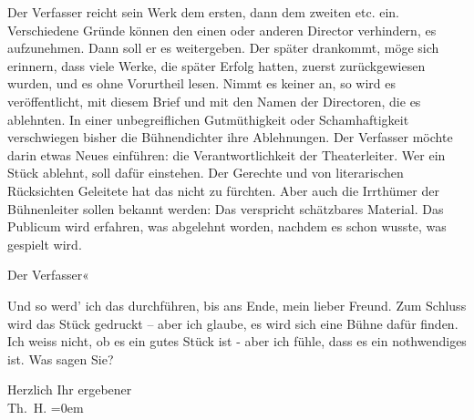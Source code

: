                Der Verfasser reicht sein Werk
               dem ersten, dann dem zweiten etc. ein. Verschiedene Gründe können den einen oder
               anderen Director verhindern, es aufzunehmen. Dann soll er es weitergeben. Der später
               drankommt, möge sich erinnern, dass viele Werke, die später Erfolg hatten, zuerst
               zurückgewiesen wurden, und es ohne Vorurtheil lesen. Nimmt es keiner an, so wird es
               veröffentlicht, mit diesem Brief {\pb}und mit
               den Namen der Directoren, die es ablehnten. In einer unbegreiflichen Gutmüthigkeit
               oder Schamhaftigkeit verschwiegen bisher die Bühnendichter ihre Ablehnungen. Der
               Verfasser möchte darin etwas Neues einführen: die Verantwortlichkeit der
               Theaterleiter. Wer ein Stück ablehnt, soll dafür einstehen. Der Gerechte und von
               literarischen Rücksichten Geleitete hat das nicht zu fürchten. Aber auch die
               Irrthümer der Bühnenleiter sollen bekannt werden: Das verspricht schätzbares
               Material. Das Publicum wird erfahren, was abgelehnt worden, nachdem es schon wusste,
               was gespielt wird.\pend
           
\pstart
           \raggedleft{}Der Verfasser«\pend
           
\pstart
           Und so werd’ ich das durchführen, bis ans Ende, mein lieber Freund. Zum Schluss wird
               das Stück gedruckt – aber ich
               glaube, es wird sich eine Bühne dafür finden. Ich weiss nicht, ob es ein gutes Stück
               ist - aber ich fühle, dass es ein nothwendiges ist. Was sagen Sie?\pend
           
\pstart
           Herzlich Ihr ergebener{\\[\baselineskip]}\spacefill\mbox{Th. H.}\pend
           \leftskip=0em{}\endnumbering{}
\begin{anhang}
\end{anhang}\newcommand{\dateiname}{L03836}\newcommand{\titel}{Theodor Herzl an Arthur Schnitzler, 13. 11. 1894}\newcommand{\editorInnen}{Selma Jahnke und Martin Anton Müller}
